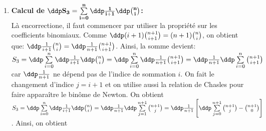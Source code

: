 \begin{correction}
\begin{enumerate}
\item  \textbf{Calcul de $\mathbf{\ddp S_3=\sum\limits_{i=0}^n \ddp\frac{1}{i+1}\ddp \binom{n}{i}}$:}\\
\noindent L\`{a} encorrectione, il faut commencer par utiliser la propri\'et\'e sur les coefficients binomiaux. 
Comme $\ddp (i+1)\binom{n+1}{i+1}=(n+1)\binom{n}{i}$, on obtient que: $\ddp\frac{1}{i+1}\binom{n}{i}= \ddp\frac{1}{n+1}\binom{n+1}{i+1}$. Ainsi, la somme devient: 
$S_3=\ddp \sum\limits_{i=0}^n \ddp\frac{1}{i+1}\ddp \binom{n}{i}=\ddp \sum\limits_{i=0}^n \ddp\frac{1}{n+1}\binom{n+1}{i+1}= \ddp\frac{1}{n+1} \ddp \sum\limits_{i=0}^n \binom{n+1}{i+1}$ car $\ddp\frac{1}{n+1} $ ne d\'epend pas de l'indice de sommation $i$. On fait le changement d'indice $j=i+1$ et on utilise aussi la relation de Chasles pour faire appara\^{i}tre le bin\^{o}me de Newton. On obtient $S_3=\ddp \sum\limits_{i=0}^n \ddp\frac{1}{i+1}\ddp \binom{n}{i}= \ddp\frac{1}{n+1} \ddp \sum\limits_{j=1}^{n+1} \binom{n+1}{j}= \ddp\frac{1}{n+1} \left\lbrack \ddp \sum\limits_{j=0}^{n+1} \binom{n+1}{j}- \binom{n+1}{0} \right\rbrack$. Ainsi, on obtient 
\end{enumerate}
\end{correction}